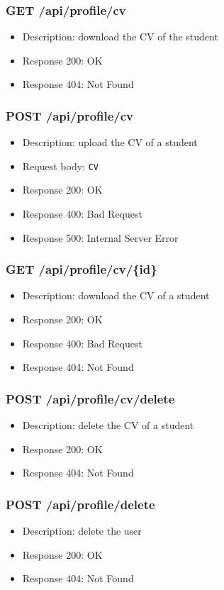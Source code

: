 \subsubsection{GET /api/profile/cv}
\begin{itemize}
    \item Description: download the CV of the student
    \item Response 200: OK
    \item Response 404: Not Found
\end{itemize}

\subsubsection{POST /api/profile/cv}
\begin{itemize}
    \item Description: upload the CV of a student
    \item Request body: \verb|CV|
    \item Response 200: OK
    \item Response 400: Bad Request
    \item Response 500: Internal Server Error
\end{itemize}

\subsubsection{GET /api/profile/cv/\{id\}}
\begin{itemize}
    \item Description: download the CV of a student
    \item Response 200: OK
    \item Response 400: Bad Request
    \item Response 404: Not Found
\end{itemize}

\subsubsection{POST /api/profile/cv/delete}
\begin{itemize}
    \item Description: delete the CV of a student
    \item Response 200: OK
    \item Response 404: Not Found
\end{itemize}

\subsubsection{POST /api/profile/delete}
\begin{itemize}
    \item Description: delete the user
    \item Response 200: OK
    \item Response 404: Not Found
\end{itemize}

